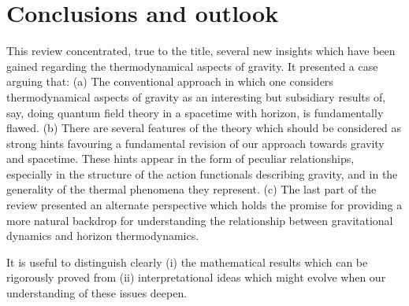 \documentclass[12pt]{iopart}
\begin{document}
\section{Conclusions and outlook}\label{sec:conclusions}

 
This review concentrated, true to the title, several new insights which  have been gained regarding the thermodynamical aspects of gravity. It presented a case arguing that:
(a) The conventional approach in which one considers thermodynamical aspects of gravity as an interesting but subsidiary results of, say, doing quantum field theory in a spacetime with horizon, is fundamentally flawed. 
(b) There are several features of the theory which should be considered as strong hints favouring
a fundamental revision of our approach towards gravity and spacetime. These hints appear in the form of peculiar relationships, especially in the structure of the action functionals describing gravity, and in the generality of the thermal phenomena they represent.
(c) The last part of the review presented an alternate perspective which holds the promise for providing a more natural backdrop for understanding the relationship between gravitational dynamics and horizon thermodynamics.

It is useful to distinguish clearly (i) the mathematical results which can be rigorously proved from (ii) interpretational ideas which might evolve when our understanding of these issues deepen.
\end{document}
